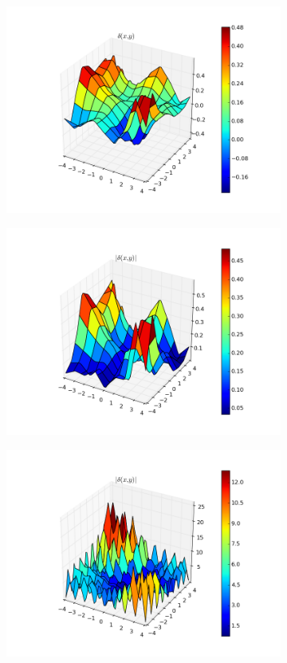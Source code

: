\documentclass[paper=a4, fontsize=11pt]{scrartcl} %
\numberwithin{equation}{section} %
\numberwithin{figure}{section} %
\numberwithin{table}{section} %
\begin{document}
\begin{figure}[h]
\begin{subfigure}[b]{0.5\textwidth}
\includegraphics[width=\textwidth]{figure_zad6.png}
\end{subfigure}
\begin{subfigure}[b]{0.5\textwidth}
\includegraphics[width=\textwidth]{figure_zad6_2.png}
\end{subfigure}
\begin{subfigure}[b]{0.5\textwidth}
\includegraphics[width=\textwidth]{figure_zad6_3.png}

\end{subfigure}
\end{figure}
\end{document}
